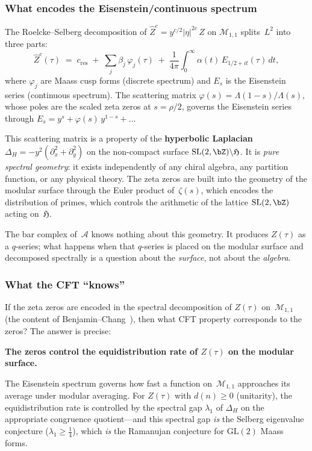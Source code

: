 \documentclass[11pt]{article}
\newcommand{\cA}{\mathcal{A}}
\newcommand{\cM}{\mathcal{M}}
\begin{document}
\subsubsection{What encodes the Eisenstein/continuous spectrum}

The Roelcke--Selberg decomposition of $\hat Z^c =
y^{c/2}|\eta|^{2c}\,Z$ on $\cM_{1,1}$ splits~$L^2$ into
three parts:
\[
  \hat Z^c(\tau)
  \;=\;
  c_{\mathrm{res}}
  \;+\;
  \sum_j \beta_j\,\varphi_j(\tau)
  \;+\;
  \frac{1}{4\pi}\int_0^\infty
  \alpha(t)\,E_{1/2+it}(\tau)\,dt,
\]
where $\varphi_j$ are Maass cusp forms (discrete spectrum)
and $E_s$ is the Eisenstein series (continuous spectrum).  The
scattering matrix
$\varphi(s) = \Lambda(1{-}s)/\Lambda(s)$,
whose poles are the scaled zeta zeros at $s = \rho/2$, governs
the Eisenstein series through
$E_s = y^s + \varphi(s)\,y^{1-s} + \ldots$

This scattering matrix is a property of the
\textbf{hyperbolic Laplacian} $\Delta_H =
-y^2(\partial_x^2 + \partial_y^2)$ on the non-compact
surface $\mathrm{SL}(2,\bZ)\backslash\mathfrak{H}$.  It is
\emph{pure spectral geometry}: it exists independently of any
chiral algebra, any partition function, or any physical theory.
The zeta zeros are built into the geometry of the modular
surface through the Euler product of~$\zeta(s)$, which encodes
the distribution of primes, which controls the arithmetic of
the lattice $\mathrm{SL}(2,\bZ)$ acting on~$\mathfrak{H}$.

The bar complex of~$\cA$ knows nothing about this geometry.
It produces $Z(\tau)$ as a $q$-series; what happens when that
$q$-series is placed on the modular surface and decomposed
spectrally is a question about the \emph{surface}, not about
the \emph{algebra}.

\subsubsection{What the CFT ``knows''}

If the zeta zeros are encoded in the spectral decomposition
of $Z(\tau)$ on~$\cM_{1,1}$
(the content of Benjamin--Chang~\cite{BenjaminChang22}),
then what CFT property corresponds to the zeros?  The answer
is precise:

\textbf{The zeros control the equidistribution rate of
$Z(\tau)$ on the modular surface.}

The Eisenstein spectrum governs how fast a function
on~$\cM_{1,1}$ approaches its average under modular
averaging.  For $Z(\tau)$ with $d(n) \geq 0$ (unitarity),
the equidistribution rate is controlled by the spectral
gap $\lambda_1$ of $\Delta_H$ on the appropriate congruence
quotient---and this spectral gap \emph{is} the Selberg
eigenvalue conjecture ($\lambda_1 \geq \tfrac{1}{4}$),
which \emph{is} the Ramanujan conjecture for
$\mathrm{GL}(2)$ Maass forms.
\end{document}
